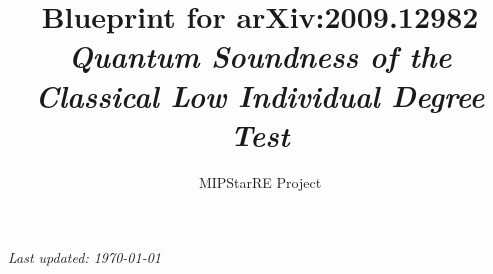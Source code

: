 \documentclass{report}
\title{Blueprint for arXiv:2009.12982\\
\textit{Quantum Soundness of the Classical Low Individual Degree Test}}
\author{MIPStarRE Project}
\begin{document}
\maketitle
\noindent\textit{Last updated: \today}\par\smallskip



\end{document}
